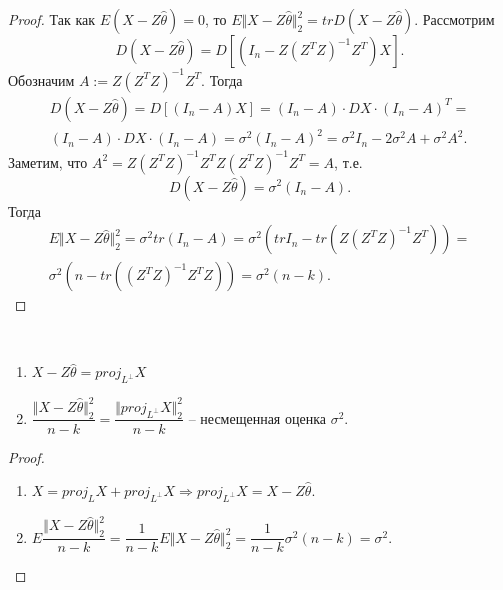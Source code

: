\begin{proof}
    Так как $\displaystyle E( X-Z\hat{\theta }) =0$, то $\displaystyle E\Vert X-Z\hat{\theta }\Vert _{2}^{2} =trD( X-Z\hat{\theta })$. Рассмотрим
    \begin{equation*}
        D( X-Z\hat{\theta }) =D\left[\left( I_{n} -Z\left( Z^{T} Z\right)^{-1} Z^{T}\right) X\right] .
    \end{equation*}
    Обозначим $\displaystyle A:=Z\left( Z^{T} Z\right)^{-1} Z^{T}$. Тогда
    \begin{gather*}
        D( X-Z\hat{\theta }) =D[( I_{n} -A) X] =( I_{n} -A) \cdotp DX\cdotp ( I_{n} -A)^{T} =\\
        ( I_{n} -A) \cdotp DX\cdotp ( I_{n} -A) =\sigma ^{2}( I_{n} -A)^{2} =\sigma ^{2} I_{n} -2\sigma ^{2} A+\sigma ^{2} A^{2} .
    \end{gather*}
    Заметим, что $\displaystyle A^{2} =Z\left( Z^{T} Z\right)^{-1} Z^{T} Z\left( Z^{T} Z\right)^{-1} Z^{T} =A$, т.е.
    \begin{equation*}
        D( X-Z\hat{\theta }) =\sigma ^{2}( I_{n} -A) .
    \end{equation*}
    Тогда
    \begin{gather*}
        E\Vert X-Z\hat{\theta }\Vert _{2}^{2} =\sigma ^{2} tr( I_{n} -A) =\sigma ^{2}\left( trI_{n} -tr\left( Z\left( Z^{T} Z\right)^{-1} Z^{T}\right)\right) =\\
        \sigma ^{2}\left( n-tr\left(\left( Z^{T} Z\right)^{-1} Z^{T} Z\right)\right) =\sigma ^{2}( n-k) .
    \end{gather*}
\end{proof}
\begin{corollary} ~
    \begin{enumerate}
        \item $\displaystyle X-Z\hat{\theta } =proj_{L^{\perp }} X$
        \item $\displaystyle \dfrac{\Vert X-Z\hat{\theta }\Vert _{2}^{2}}{n-k} =\dfrac{\Vert proj_{L^{\perp }} X\Vert _{2}^{2}}{n-k}$ -- несмещенная оценка $\displaystyle \sigma ^{2}$.
    \end{enumerate}
\end{corollary}
\begin{proof} ~
    \begin{enumerate}
        \item $\displaystyle X=proj_{L} X+proj_{L^{\perp }} X\Rightarrow proj_{L^{\perp }} X=X-Z\hat{\theta }$.
        \item $\displaystyle E\dfrac{\Vert X-Z\hat{\theta }\Vert _{2}^{2}}{n-k} =\dfrac{1}{n-k} E\Vert X-Z\hat{\theta }\Vert _{2}^{2} =\dfrac{1}{n-k} \sigma ^{2}( n-k) =\sigma ^{2}$.
    \end{enumerate}
\end{proof}
